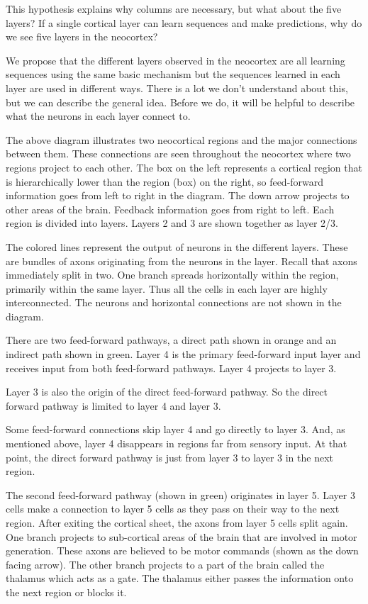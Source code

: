 \documentclass{report}
\begin{document}
This hypothesis explains why columns are necessary, but what about the
five layers? If a single cortical layer can learn sequences and make
predictions, why do we see five layers in the neocortex?

We propose that the different layers observed in the neocortex are all
learning sequences using the same basic mechanism but the sequences
learned in each layer are used in different ways. There is a lot we
don't understand about this, but we can describe the general
idea. Before we do, it will be helpful to describe what the neurons in
each layer connect to.


The above diagram illustrates two neocortical regions and the major
connections between them. These connections are seen throughout the
neocortex where two regions project to each other. The box on the left
represents a cortical region that is hierarchically lower than the
region (box) on the right, so feed-forward information goes from left
to right in the diagram. The down arrow projects to other areas of the
brain. Feedback information goes from right to left. Each region is
divided into layers. Layers 2 and 3 are shown together as layer 2/3.

The colored lines represent the output of neurons in the different
layers. These are bundles of axons originating from the neurons in the
layer. Recall that axons immediately split in two. One branch spreads
horizontally within the region, primarily within the same layer. Thus
all the cells in each layer are highly interconnected. The neurons and
horizontal connections are not shown in the diagram.

There are two feed-forward pathways, a direct path shown in orange and
an indirect path shown in green. Layer 4 is the primary feed-forward
input layer and receives input from both feed-forward pathways. Layer
4 projects to layer 3.

Layer 3 is also the origin of the direct feed-forward pathway. So the
direct forward pathway is limited to layer 4 and layer 3.

Some feed-forward connections skip layer 4 and go directly to layer
3. And, as mentioned above, layer 4 disappears in regions far from
sensory input. At that point, the direct forward pathway is just from
layer 3 to layer 3 in the next region.

The second feed-forward pathway (shown in green) originates in layer
5. Layer 3 cells make a connection to layer 5 cells as they pass on
their way to the next region. After exiting the cortical sheet, the
axons from layer 5 cells split again. One branch projects to
sub-cortical areas of the brain that are involved in motor
generation. These axons are believed to be motor commands (shown as
the down facing arrow). The other branch projects to a part of the
brain called the thalamus which acts as a gate. The thalamus either
passes the information onto the next region or blocks it.
\end{document}
